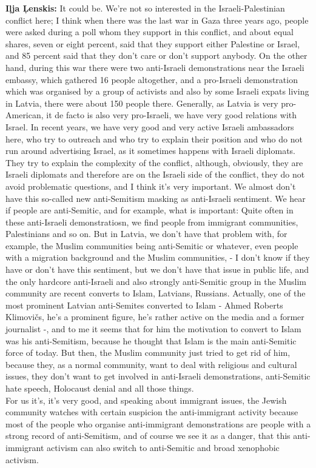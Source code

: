\textbf{Iļja Ļenskis:} It could be. We’re not so interested in the Israeli-Palestinian conflict here; I think when there was the last war in Gaza three years ago, people were asked during a poll whom they support in this conflict, and about equal shares, seven or eight percent, said that they support either Palestine or Israel, and 85 percent said that they don’t care or don’t support anybody. On the other hand, during this war there were two anti-Israeli demonstrations near the Israeli embassy, which gathered 16 people altogether, 
and a pro-Israeli demonstration which was organised by a group of activists and also by some Israeli expats living in Latvia, there were about 150 people there. Generally, as Latvia is very pro-American, it de facto is also very pro-Israeli, we have very good relations with Israel. In recent years, we have very good and very active Israeli ambassadors here, who try to outreach and who try to explain their position and who do not run around advertising Israel, as it sometimes happens with Israeli diplomats. They try to explain the complexity of the conflict, although, obviously, they are Israeli diplomats and therefore are on the Israeli side of the conflict, they do not avoid problematic questions, and I think it's very important. We almost don’t have this so-called new anti-Semitism masking as anti-Israeli sentiment. We hear if people are anti-Semitic, and for example, what is important: Quite often in these anti-Israeli demonstratiosn, we find people from immigrant communities, Palestinians and so on. But in Latvia, we don’t have that problem with, for example, the Muslim communities being anti-Semitic or whatever, even people with a migration background and the Muslim communities, - I don’t know if they have or don’t have this sentiment, but we don’t have that issue in public life, and the only hardcore anti-Israeli and also strongly anti-Semitic group in the Muslim community are recent converts to Islam, Latvians, Russians. Actually, one of the most prominent Latvian anti-Semites converted to Islam - Ahmed Roberts Klimovičs, he’s a prominent figure, he’s rather active on the media and a former journalist -, and to me it seems that for him the motivation to convert to Islam was his anti-Semitism, because he thought that Islam is the main anti-Semitic force of today. But then, the Muslim community just tried to get rid of him, because they, as a normal community, want to deal with religious and cultural issues, they don’t want to get involved in anti-Israeli demonstrations, anti-Semitic hate speech, Holocaust denial and all those things. \\
For us it’s, it’s very good, and speaking about immigrant issues, the Jewish community watches with certain suspicion the anti-immigrant activity because most of the people who organise anti-immigrant demonstrations are people with a strong record of anti-Semitism, and of course we see it as a danger, that this anti-immigrant activism can also switch to anti-Semitic and broad xenophobic activism. 

